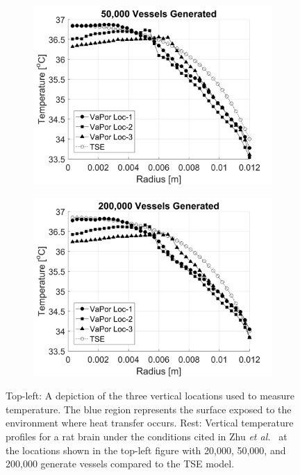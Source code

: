 \documentclass[11pt,english,a4paper,twoside,openright]{report}
\begin{document}
{{{{{{{\begin{figure}[h]
\begin{subfigure}[b]{0.49\textwidth}
	\end{subfigure}
	\begin{subfigure}[b]{0.49\textwidth}
		\includegraphics[width=\textwidth]{Chapter5/Chapter5_RatBrain_50000}
	\end{subfigure}
	\begin{subfigure}[b]{0.49\textwidth}
		\includegraphics[width=\textwidth]{Chapter5/Chapter5_RatBrain_200000}
	\end{subfigure}
	\caption[Depiction of surface heat transfer and vertical temperature profiles for the VaPor model and TSE model in a rat brain]{Top-left: A depiction of the three vertical locations used to measure temperature. The blue region represents the surface exposed to the environment where heat transfer occurs. Rest: Vertical temperature profiles for a rat brain under the conditions cited in Zhu \textit{et al.\ }\cite{zhu2006body} at the locations shown in the top-left figure with 20,000, 50,000, and 200,000 generate vessels compared to the TSE model.}
	\label{fig:RatBrainResults1}
\end{figure}

}}}}}}}
\end{document}
